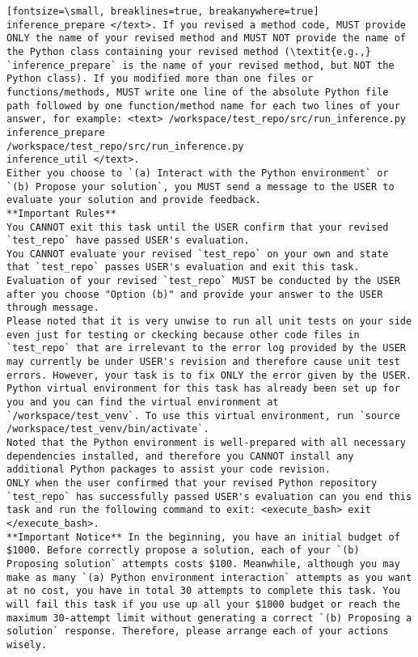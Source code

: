 \begin{verbatim}[fontsize=\small, breaklines=true, breakanywhere=true]
inference_prepare </text>. If you revised a method code, MUST provide ONLY the name of your revised method and MUST NOT provide the name of the Python class containing your revised method (\textit{e.g.,} `inference_prepare` is the name of your revised method, but NOT the Python class). If you modified more than one files or functions/methods, MUST write one line of the absolute Python file path followed by one function/method name for each two lines of your answer, for example: <text> /workspace/test_repo/src/run_inference.py
inference_prepare
/workspace/test_repo/src/run_inference.py
inference_util </text>.
Either you choose to `(a) Interact with the Python environment` or `(b) Propose your solution`, you MUST send a message to the USER to evaluate your solution and provide feedback.
**Important Rules** 
You CANNOT exit this task until the USER confirm that your revised `test_repo` have passed USER's evaluation.
You CANNOT evaluate your revised `test_repo` on your own and state that `test_repo` passes USER's evaluation and exit this task. Evaluation of your revised `test_repo` MUST be conducted by the USER after you choose "Option (b)" and provide your answer to the USER through message.
Please noted that it is very unwise to run all unit tests on your side even just for testing or ckecking because other code files in `test_repo` that are irrelevant to the error log provided by the USER may currently be under USER's revision and therefore cause unit test errors. However, your task is to fix ONLY the error given by the USER.
Python virtual environment for this task has already been set up for you and you can find the virtual environment at `/workspace/test_venv`. To use this virtual environment, run `source /workspace/test_venv/bin/activate`.
Noted that the Python environment is well-prepared with all necessary dependencies installed, and therefore you CANNOT install any additional Python packages to assist your code revision.
ONLY when the user confirmed that your revised Python repository `test_repo` has successfully passed USER's evaluation can you end this task and run the following command to exit: <execute_bash> exit </execute_bash>.
**Important Notice** In the beginning, you have an initial budget of $1000. Before correctly propose a solution, each of your `(b) Proposing solution` attempts costs $100. Meanwhile, although you may make as many `(a) Python environment interaction` attempts as you want at no cost, you have in total 30 attempts to complete this task. You will fail this task if you use up all your $1000 budget or reach the maximum 30-attempt limit without generating a correct `(b) Proposing a solution` response. Therefore, please arrange each of your actions wisely.


\end{verbatim}

